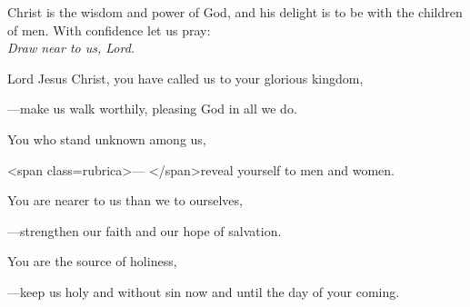 \intercessions\indent

\begin{hangpar}

Christ is the wisdom and power of God, and his delight is to be with the children of men. With confidence let us pray:\\
\emph{Draw near to us, Lord.}

\medskip Lord Jesus Christ, you have called us to your glorious kingdom,

{\color{red}---\thinspace}make us walk worthily, pleasing God in all we do.

\medskip You who stand unknown among us,

<span class=rubrica>— </span>reveal yourself to men and women.

\medskip You are nearer to us than we to ourselves,

{\color{red}---\thinspace}strengthen our faith and our hope of salvation.

\medskip You are the source of holiness,

{\color{red}---\thinspace}keep us holy and without sin now and until the day of your coming.

\end{hangpar}